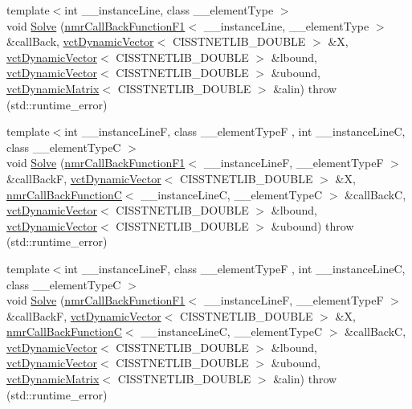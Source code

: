 \begin{DoxyCompactItemize}
\item 
{\footnotesize template$<$int \+\_\+\+\_\+instance\+Line, class \+\_\+\+\_\+element\+Type $>$ }\\void \hyperlink{classnmr_fmin_solver_aa00f3effd7a544f2c83c3ee4be93e4c0}{Solve} (\hyperlink{classnmr_call_back_function_f1}{nmr\+Call\+Back\+Function\+F1}$<$ \+\_\+\+\_\+instance\+Line, \+\_\+\+\_\+element\+Type $>$ \&call\+Back, \hyperlink{classvct_dynamic_vector}{vct\+Dynamic\+Vector}$<$ C\+I\+S\+S\+T\+N\+E\+T\+L\+I\+B\+\_\+\+D\+O\+U\+B\+L\+E $>$ \&X, \hyperlink{classvct_dynamic_vector}{vct\+Dynamic\+Vector}$<$ C\+I\+S\+S\+T\+N\+E\+T\+L\+I\+B\+\_\+\+D\+O\+U\+B\+L\+E $>$ \&lbound, \hyperlink{classvct_dynamic_vector}{vct\+Dynamic\+Vector}$<$ C\+I\+S\+S\+T\+N\+E\+T\+L\+I\+B\+\_\+\+D\+O\+U\+B\+L\+E $>$ \&ubound, \hyperlink{classvct_dynamic_matrix}{vct\+Dynamic\+Matrix}$<$ C\+I\+S\+S\+T\+N\+E\+T\+L\+I\+B\+\_\+\+D\+O\+U\+B\+L\+E $>$ \&alin)  throw (std\+::runtime\+\_\+error)
\item 
{\footnotesize template$<$int \+\_\+\+\_\+instance\+Line\+F, class \+\_\+\+\_\+element\+Type\+F , int \+\_\+\+\_\+instance\+Line\+C, class \+\_\+\+\_\+element\+Type\+C $>$ }\\void \hyperlink{classnmr_fmin_solver_a4f06efc7c3e335a02609a459904883fb}{Solve} (\hyperlink{classnmr_call_back_function_f1}{nmr\+Call\+Back\+Function\+F1}$<$ \+\_\+\+\_\+instance\+Line\+F, \+\_\+\+\_\+element\+Type\+F $>$ \&call\+Back\+F, \hyperlink{classvct_dynamic_vector}{vct\+Dynamic\+Vector}$<$ C\+I\+S\+S\+T\+N\+E\+T\+L\+I\+B\+\_\+\+D\+O\+U\+B\+L\+E $>$ \&X, \hyperlink{classnmr_call_back_function_c}{nmr\+Call\+Back\+Function\+C}$<$ \+\_\+\+\_\+instance\+Line\+C, \+\_\+\+\_\+element\+Type\+C $>$ \&call\+Back\+C, \hyperlink{classvct_dynamic_vector}{vct\+Dynamic\+Vector}$<$ C\+I\+S\+S\+T\+N\+E\+T\+L\+I\+B\+\_\+\+D\+O\+U\+B\+L\+E $>$ \&lbound, \hyperlink{classvct_dynamic_vector}{vct\+Dynamic\+Vector}$<$ C\+I\+S\+S\+T\+N\+E\+T\+L\+I\+B\+\_\+\+D\+O\+U\+B\+L\+E $>$ \&ubound)  throw (std\+::runtime\+\_\+error)
\item 
{\footnotesize template$<$int \+\_\+\+\_\+instance\+Line\+F, class \+\_\+\+\_\+element\+Type\+F , int \+\_\+\+\_\+instance\+Line\+C, class \+\_\+\+\_\+element\+Type\+C $>$ }\\void \hyperlink{classnmr_fmin_solver_a116bcd32c227c99f1956bbe8b2486827}{Solve} (\hyperlink{classnmr_call_back_function_f1}{nmr\+Call\+Back\+Function\+F1}$<$ \+\_\+\+\_\+instance\+Line\+F, \+\_\+\+\_\+element\+Type\+F $>$ \&call\+Back\+F, \hyperlink{classvct_dynamic_vector}{vct\+Dynamic\+Vector}$<$ C\+I\+S\+S\+T\+N\+E\+T\+L\+I\+B\+\_\+\+D\+O\+U\+B\+L\+E $>$ \&X, \hyperlink{classnmr_call_back_function_c}{nmr\+Call\+Back\+Function\+C}$<$ \+\_\+\+\_\+instance\+Line\+C, \+\_\+\+\_\+element\+Type\+C $>$ \&call\+Back\+C, \hyperlink{classvct_dynamic_vector}{vct\+Dynamic\+Vector}$<$ C\+I\+S\+S\+T\+N\+E\+T\+L\+I\+B\+\_\+\+D\+O\+U\+B\+L\+E $>$ \&lbound, \hyperlink{classvct_dynamic_vector}{vct\+Dynamic\+Vector}$<$ C\+I\+S\+S\+T\+N\+E\+T\+L\+I\+B\+\_\+\+D\+O\+U\+B\+L\+E $>$ \&ubound, \hyperlink{classvct_dynamic_matrix}{vct\+Dynamic\+Matrix}$<$ C\+I\+S\+S\+T\+N\+E\+T\+L\+I\+B\+\_\+\+D\+O\+U\+B\+L\+E $>$ \&alin)  throw (std\+::runtime\+\_\+error)

\end{DoxyCompactItemize}
